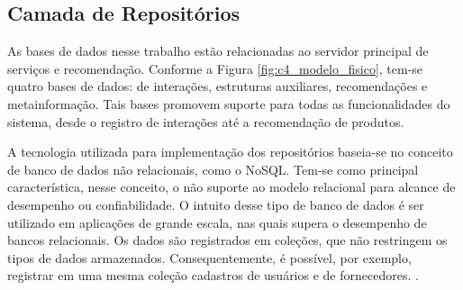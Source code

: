 

\subsection{Camada de Repositórios}

As bases de dados nesse trabalho estão relacionadas ao servidor principal de serviços e recomendação. Conforme a Figura \ref{fig:c4_modelo_fisico}, tem-se quatro bases de dados: de interações, estruturas auxiliares, recomendações e metainformação. Tais bases promovem suporte para todas as funcionalidades do sistema, desde o registro de interações até a recomendação de produtos. 

A tecnologia utilizada para implementação dos repositórios baseia-se no conceito de banco de dados não relacionais, como o NoSQL. Tem-se como principal característica, nesse conceito, o não suporte ao modelo relacional para alcance de desempenho ou confiabilidade. O intuito desse tipo de banco de dados é ser utilizado em aplicações de grande escala, nas quais supera o desempenho de bancos relacionais. Os dados são registrados em coleções, que não restringem os tipos de dados armazenados. Consequentemente, é possível, por exemplo, registrar em uma mesma coleção cadastros de usuários e de fornecedores. \cite{Boicea2012}. 

